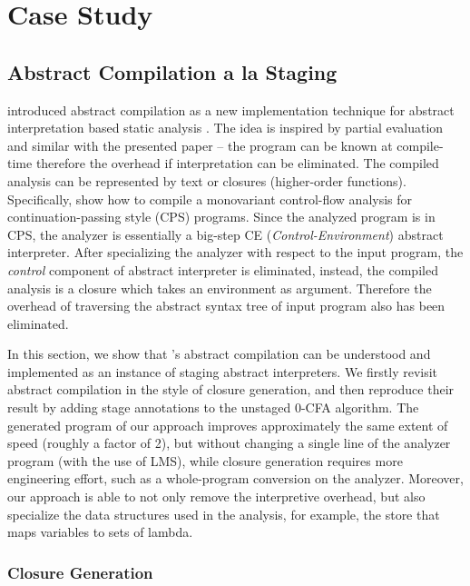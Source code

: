 \section{Case Study} \label{cases_study}

\subsection{Abstract Compilation a la Staging}

\citeauthor{Boucher:1996:ACN:647473.727587} introduced abstract compilation as a new
implementation technique for abstract interpretation based static analysis \cite{Boucher:1996:ACN:647473.727587}.
The idea is inspired by partial evaluation and similar with the presented paper -- the program can be known 
at compile-time therefore the overhead if interpretation can be eliminated. The compiled analysis
can be represented by text or closures (higher-order functions).
Specifically, \citeauthor{Boucher:1996:ACN:647473.727587} show how to compile a monovariant control-flow 
analysis \cite{Shivers:1991:SSC:115865.115884, Shivers:1988:CFA:53990.54007} 
for continuation-passing style (CPS) programs. Since the analyzed program is in CPS, the analyzer 
is essentially a big-step CE (\textit{Control-Environment}) abstract interpreter.
After specializing the analyzer with respect to the input program, the \textit{control} component of 
abstract interpreter is eliminated, instead, the compiled analysis is a closure which takes an 
environment as argument. Therefore the overhead of traversing the abstract syntax tree of input 
program also has been eliminated.

In this section, we show that \citeauthor{Boucher:1996:ACN:647473.727587}'s abstract compilation can be 
understood and implemented as an instance of staging abstract interpreters.
We firstly revisit abstract compilation in the style of closure generation,
and then reproduce their result by adding stage annotations to the unstaged 0-CFA algorithm.
The generated program of our approach improves approximately the same extent of speed (roughly a factor of 2),
but without changing a single line of the analyzer program (with the use of LMS), 
while closure generation requires more engineering effort, such as a whole-program 
conversion on the analyzer. Moreover, our approach is able to not only remove the interpretive
overhead, but also specialize the data structures used in the analysis, for example, the store
that maps variables to sets of lambda.

\subsubsection{Closure Generation}

